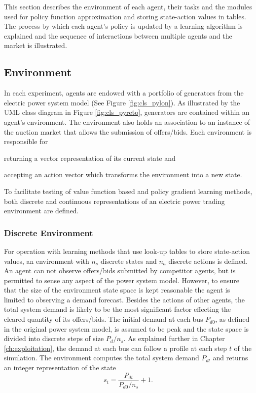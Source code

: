 This section describes the environment of each agent, their tasks and the
modules used for policy function approximation and storing state-action values
in tables. The process by which each agent's policy is updated by a learning
algorithm is explained and the sequence of interactions between multiple
agents and the market is illustrated.

\subsection{Environment}
In each experiment, agents are endowed with a portfolio of generators from the
electric power system model (See Figure \ref{fig:cls_pylon}).  As
illustrated by the UML class diagram in Figure \ref{fig:cls_pyreto},
generators are contained within an agent's environment.  The environment also
holds an association to an instance of the auction market that allows the
submission of offers/bids. Each environment is responsible for \begin{inparaenum}[(i)]
\item returning a vector representation of its current state and \item
accepting an action vector which transforms the environment into a new state.
\end{inparaenum}  To facilitate testing of value function based and policy
gradient learning methods, both discrete and continuous representations of an
electric power trading environment are defined.


\subsubsection{Discrete Environment}
For operation with learning methods that use look-up tables to store
state-action values, an environment with $n_s$ discrete states and $n_a$
discrete actions is defined.  An agent can not observe offers/bids submitted
by competitor agents, but is permitted to sense any aspect of the power system
model.  However, to ensure that the size of the environment state space is
kept reasonable the agent is limited to observing a demand forecast.  Besides
the actions of other agents, the total system demand is likely to be the most
significant factor effecting the cleared quantity of its offers/bids.  The
initial demand at each bus $P_{d0}$, as defined in the original power system
model, is assumed to be peak and the state space is divided into discrete
steps of size $P_d / n_s$.  As explained further in Chapter
\ref{ch:exploitation}, the demand at each bus can follow a profile at each
step $t$ of the simulation.  The environment computes the total system demand
$P_{d t}$ and returns an integer representation of the state
\begin{equation}
s_t = \frac{P_{d t}}{P_{d0} / n_s} + 1.
\end{equation}

